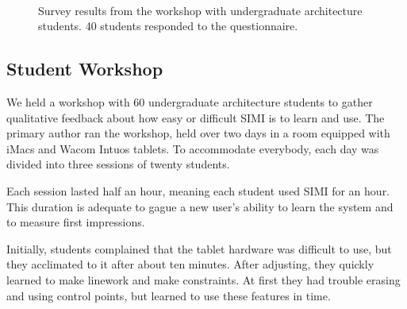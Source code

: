 \documentclass{article}
\begin{document}
\begin{figure}[t]
{}
\\
\caption{Survey results from the workshop with undergraduate
  architecture students. 40 students responded to the questionnaire.}

\label{fig:survey}
\end{figure}

\subsection{Student Workshop}

We held a workshop with 60 undergraduate architecture students to
gather qualitative feedback about how easy or difficult SIMI is to
learn and use. The primary author ran the workshop, held over two days
in a room equipped with iMacs and Wacom Intuos tablets. To accommodate
everybody, each day was divided into three sessions of twenty
students.

Each session lasted half an hour, meaning each student used SIMI for
an hour. This duration is adequate to gague a new user's ability to
learn the system and to measure first impressions.

Initially, students complained that the tablet hardware was difficult
to use, but they acclimated to it after about ten minutes. After
adjusting, they quickly learned to make linework and make
constraints. At first they had trouble erasing and using control
points, but learned to use these features in time. 

\end{document}
